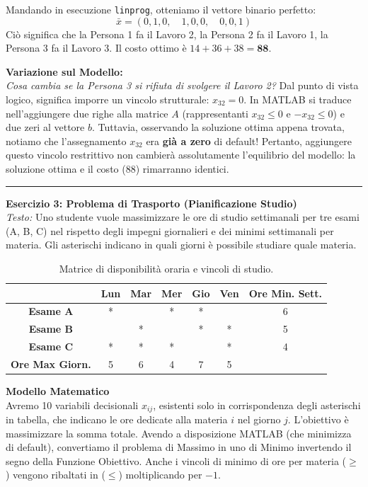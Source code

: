 \documentclass[12pt, a4paper]{article}
\renewcommand{\arraystretch}{1.25}
\begin{document}
	Mandando in esecuzione \texttt{linprog}, otteniamo il vettore binario perfetto:
	\[
	\bar{x} = (0, 1, 0, \quad 1, 0, 0, \quad 0, 0, 1)
	\]
	Ciò significa che la Persona 1 fa il Lavoro 2, la Persona 2 fa il Lavoro 1, la Persona 3 fa il Lavoro 3.
	Il costo ottimo è $14 + 36 + 38 = \mathbf{88}$.
	
	\textbf{Variazione sul Modello:}\\
	\textit{Cosa cambia se la Persona 3 si rifiuta di svolgere il Lavoro 2?}
	Dal punto di vista logico, significa imporre un vincolo strutturale: $x_{32} = 0$. 
	In MATLAB si traduce nell'aggiungere due righe alla matrice $A$ (rappresentanti $x_{32} \leq 0$ e $-x_{32} \leq 0$) e due zeri al vettore $b$. 
	Tuttavia, osservando la soluzione ottima appena trovata, notiamo che l'assegnamento $x_{32}$ era \textbf{già a zero} di default! Pertanto, aggiungere questo vincolo restrittivo non cambierà assolutamente l'equilibrio del modello: la soluzione ottima e il costo (88) rimarranno identici.
	
	\vspace{0.6cm}
	\hrule
	\vspace{0.4cm}
	
	\textbf{Esercizio 3: Problema di Trasporto (Pianificazione Studio)}\\
	\textit{Testo:} Uno studente vuole massimizzare le ore di studio settimanali per tre esami (A, B, C) nel rispetto degli impegni giornalieri e dei minimi settimanali per materia. Gli asterischi indicano in quali giorni è possibile studiare quale materia.
	
	\begin{table}[H]
		\centering
		\renewcommand{\arraystretch}{1.3}
		\begin{tabular}{|c|c|c|c|c|c|c|}
			\hline
			& \textbf{Lun} & \textbf{Mar} & \textbf{Mer} & \textbf{Gio} & \textbf{Ven} & \textbf{Ore Min. Sett.} \\ \hline
			\textbf{Esame A} & * & & * & * & & 6 \\ \hline
			\textbf{Esame B} & & * & & * & * & 5 \\ \hline
			\textbf{Esame C} & * & * & * & & * & 4 \\ \hline
			\textbf{Ore Max Giorn.} & 5 & 6 & 4 & 7 & 5 & \\ \hline
		\end{tabular}
		\caption{Matrice di disponibilità oraria e vincoli di studio.}
	\end{table}
	
	\textbf{Modello Matematico}\\
	Avremo 10 variabili decisionali $x_{ij}$, esistenti solo in corrispondenza degli asterischi in tabella, che indicano le ore dedicate alla materia $i$ nel giorno $j$. L'obiettivo è massimizzare la somma totale.
	Avendo a disposizione MATLAB (che minimizza di default), convertiamo il problema di Massimo in uno di Minimo invertendo il segno della Funzione Obiettivo. Anche i vincoli di minimo di ore per materia ($\geq$) vengono ribaltati in ($\leq$) moltiplicando per $-1$.
	
\end{document}
